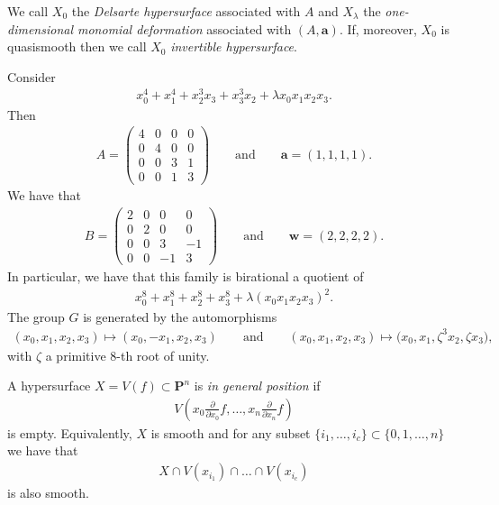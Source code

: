 \documentclass[pdftex]{sigma}
\numberwithin{equation}{section}
\begin{document}
\begin{Definition}
We call $X_0$ the \emph{Delsarte hypersurface} associated with $A$ and $X_\lambda$ the \emph{one-dimen\-sio\-nal monomial deformation} associated with $(A,\mathbf{a})$. If, moreover, $X_0$ is quasismooth then we call $X_0$ \emph{invertible hypersurface}.
\end{Definition}

\begin{Example} Consider
\begin{gather*} x_0^4+x_1^4+x_2^3x_3+x_3^3x_2+\lambda x_0x_1x_2x_3.\end{gather*}
Then
\begin{gather*} A=\left(\begin{matrix} 4&0&0&0\\0&4&0&0\\0&0&3&1\\0&0&1&3\end{matrix} \right) \qquad \text{and} \qquad \mathbf{a}=(1,1,1,1).\end{gather*}
We have that
\begin{gather*} B=\left(\begin{matrix} 2&0&0&0\\0&2&0&0\\0&0&3&-1\\0&0&-1&3\end{matrix} \right) \qquad \text{and} \qquad \mathbf{w}=(2,2,2,2). \end{gather*}
In particular, we have that this family is birational a quotient of
\begin{gather*} x_0^8+x_1^8+x_2^8+x_3^8+\lambda (x_0x_1x_2x_3)^2.\end{gather*}
The group $G$ is generated by the automorphisms
\begin{gather*} (x_0,x_1,x_2,x_3)\mapsto(x_0,-x_1,x_2,x_3)\qquad \text{and} \qquad
(x_0,x_1,x_2,x_3)\mapsto\big(x_0,x_1,\zeta^3 x_2,\zeta x_3\big),\end{gather*} with $\zeta$ a primitive $8$-th root of unity.
\end{Example}

\begin{Definition}\label{defGenPos} A hypersurface $X=V(f)\subset \mathbf{P}^n$ is \emph{in general position} if
\begin{gather*} V\left(x_0\frac{\partial}{\partial{x_0}} f, \dots,x_n\frac{\partial}{\partial{x_n}} f\right)\end{gather*}
is empty. Equivalently, $X$ is smooth and for any subset $\{i_1,\dots,i_c\} \subset \{0,1,\dots,n\}$ we have that
\begin{gather*} X \cap V(x_{i_1})\cap \dots \cap V(x_{i_c})\end{gather*}
is also smooth.
\end{Definition}
\end{document}
